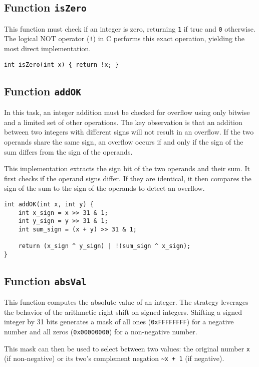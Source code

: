 \documentclass{article}
\begin{document}
\subsection{Function \texttt{isZero}}

This function must check if an integer is zero, returning \verb|1| if true and
\verb|0| otherwise. The logical NOT operator (\verb|!|) in C performs this exact
operation, yielding the most direct implementation.

\begin{verbatim}
int isZero(int x) { return !x; }
\end{verbatim}

\subsection{Function \texttt{addOK}}

In this task, an integer addition must be checked for overflow using only
bitwise and a limited set of other operations. The key observation is that an
addition between two integers with different signs will not result in an
overflow. If the two operands share the same sign, an overflow occurs if and 
only if the sign of the sum differs from the sign of the operands.

This implementation extracts the sign bit of the two operands and their sum. It
first checks if the operand signs differ. If they are identical, it then
compares the sign of the sum to the sign of the operands to detect an overflow.

\begin{verbatim}
int addOK(int x, int y) {
    int x_sign = x >> 31 & 1;
    int y_sign = y >> 31 & 1;
    int sum_sign = (x + y) >> 31 & 1;

    return (x_sign ^ y_sign) | !(sum_sign ^ x_sign);
}
\end{verbatim}

\subsection{Function \texttt{absVal}}

This function computes the absolute value of an integer. The strategy leverages
the behavior of the arithmetic right shift on signed integers. Shifting a signed
integer by 31 bits generates a mask of all ones (\verb|0xFFFFFFFF|) for a
negative number and all zeros (\verb|0x00000000|) for a non-negative number.

This mask can then be used to select between two values: the original number 
\verb|x| (if non-negative) or its two's complement negation \verb|~x + 1| (if 
negative).
\end{document}
